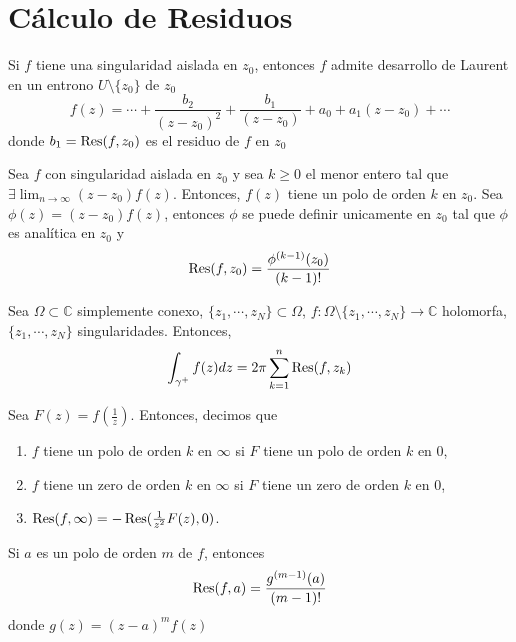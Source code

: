 \section{Cálculo de Residuos}

\begin{note}
  Si $f$ tiene una singularidad aislada en $z_{0}$, entonces $f$ admite desarrollo de Laurent en un entrono $U \setminus \{ z_{0} \}$ de $z_{0}$
  \[ 
    f(z) = \cdots + \frac{b_{2}}{(z - z_{0})^{2}} + \frac{b_{1}}{(z - z_{0})} + a_{0} + a_{1}(z - z_{0}) + \cdots 
  \] 
  donde $b_{1} = \operatorname{Res} (f, z_{0})$ es el residuo de $f$ en $z_{0}$
\end{note}

\begin{prop}
  Sea $f$ con singularidad aislada en $z_{0}$ y sea $k \geq 0$ el menor entero tal que $\exists \lim_{n \to \infty} (z - z_{0}) f(z)$. Entonces, $f(z)$ tiene un polo de orden $k$ en $z_{0}$. Sea $\phi(z) = (z - z_{0}) f(z)$, entonces $\phi$ se puede definir unicamente en $z_{0}$ tal que $\phi$ es analítica en $z_{0}$ y
  \[ 
    \operatorname{Res}(f, z_{0}) = \frac{\phi^{(k-1)}(z_{0})}{(k-1)!} 
  \] 
\end{prop}

\begin{theo}
  Sea $\Omega \subset \mathbb{C}$ simplemente conexo, $\{ z_{1}, \cdots, z_{N} \} \subset \Omega$, $f : \Omega \setminus \{ z_{1}, \cdots, z_{N} \} \to \mathbb{C}$ holomorfa, $\{ z_{1}, \cdots, z_{N} \}$ singularidades. Entonces, 
  \[ 
    \int_{\gamma^{+}}^{} f(z) dz = 2 \pi \sum_{k = 1}^{n} \operatorname{Res} (f, z_{k})
  \] 
\end{theo}

\begin{defn}
  Sea $F(z) = f(\frac{1}{z})$. Entonces, decimos que
  \begin{enumerate}[label=(\roman*)]
    \item $f$ tiene un polo de orden $k$ en $\infty$ si $F$ tiene un polo de orden $k$ en $0$,
    \item $f$ tiene un zero de orden $k$ en $\infty$ si $F$ tiene un zero de orden $k$ en $0$,
    \item $\operatorname{Res}(f, \infty) = -  \operatorname{Res}(\frac{1}{z^{2}}F(z), 0)$.
  \end{enumerate}
\end{defn}

\begin{prop}
  Si $a$ es un polo de orden $m$ de $f$, entonces
  \[
    \operatorname{Res} (f,a) = \frac{g^{(m-1)}(a)}{(m - 1)!}
  \]
  donde $g(z) = (z - a)^{m} f(z)$
\end{prop}
